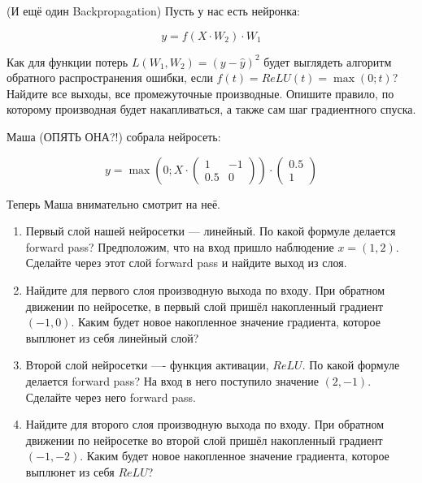 \documentclass[12pt, a4paper, oneside]{article}
\theoremstyle{plain} %
\theoremstyle{definition}
\begin{document}
\begin{problem}{(И ещё один Backpropagation)}
	Пусть у нас есть нейронка: 
	
	$$ 
	y = f(X \cdot W_2 ) \cdot W_1 
	$$
	
	Как для функции потерь $L(W_1, W_2) = (y - \hat y)^2$ будет выглядеть алгоритм обратного распространения ошибки, если $f(t) = ReLU(t) =  \max(0; t)$? Найдите все выходы, все промежуточные производные.  Опишите правило, по которому производная будет накапливаться, а также сам шаг градиентного спуска. 
\end{problem} 


\begin{problem}
	Маша (ОПЯТЬ ОНА?!) собрала нейросеть: 
	
	\begin{equation*}
	y =   \max \left( 0;  X \cdot  \begin{pmatrix} 1 & -1 \\ 0.5 & 0 \end{pmatrix} \right) \cdot \begin{pmatrix} 0.5 \\ 1 \end{pmatrix} 
	\end{equation*}

	Теперь Маша внимательно смотрит на неё.
	
	\begin{enumerate}
		\item  Первый слой нашей нейросетки --- линейный. По какой формуле делается forward pass? Предположим, что на вход пришло наблюдение $x = (1, 2)$. Сделайте через этот слой forward pass и найдите выход из слоя.
		
		\item Найдите для первого слоя производную выхода по входу. При обратном движении по нейросетке, в первый слой пришёл накопленный градиент $(-1, 0)$. Каким будет новое накопленное значение градиента, которое выплюнет из себя линейный слой? 
		
		\item Второй слой нейросетки ---- функция активации, $ReLU.$  По какой формуле делается forward pass? На вход в него поступило значение $(2, -1)$. Сделайте через него forward pass. 
		
		\item Найдите для второго слоя производную выхода по входу. При обратном движении по нейросетке во второй слой пришёл накопленный градиент $(-1, -2)$.  Каким будет новое накопленное значение градиента, которое выплюнет из себя $ReLU$? 
		

\end{enumerate}
\end{problem}
\end{document}
